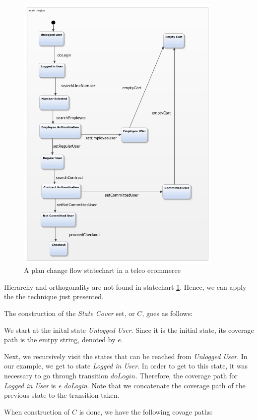 \begin{figure}[htb]
\centering
\includegraphics[width=10cm]{figuras/trocaPlano}
\caption{\label{fig:trocaPlano} A plan change flow statechart in a telco ecommerce}
\end{figure}

Hierarchy and orthogonality are not found in statechart \ref{fig:trocaPlano}. Hence, we can apply the the technique just presented.

The construction of the \textit{State Cover} set, or $C$, goes as follows:

We start at the inital state \textit{Unlogged User}. Since it is the initial state, its coverage path is the emtpy string, denoted by $e$.

Next, we recursively visit the states that can be reached from \textit{Unlogged User}. In our example, we get to state \textit{Logged in User}. In order to get to this state, it was necessary to go through transition $doLogin$. Therefore, the coverage path for \textit{Logged in User} is \textit{e doLogin}. Note that we concatenate the coverage path of the previous state to the transition taken.

When construction of $C$ is done, we have the following covage paths:


